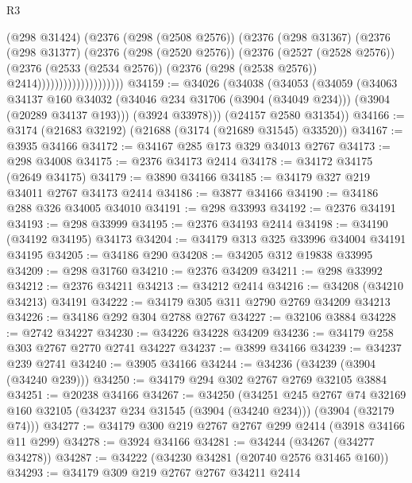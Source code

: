 \begin{lexlean}{R3}
\begin{coremodule}
                              (@298 @31424)
                              (@2376
                                (@298 (@2508 @2576))
                                (@2376
                                  (@298 @31367)
                                  (@2376
                                    (@298 @31377)
                                    (@2376
                                      (@298 (@2520 @2576))
                                      (@2376
                                        (@2527 (@2528 @2576))
                                        (@2376
                                          (@2533 (@2534 @2576))
                                          (@2376 (@298 (@2538 @2576)) @2414))))))))))))))))))))
@34159 := @34026
    (@34038
      (@34053
        (@34059
          (@34063
            @34137
            @160
            @34032
            (@34046 @234 @31706 (@3904 (@34049 @234)))
            (@3904 (@20289 @34137 @193)))
          (@3924 @33978)))
      (@24157 @2580 @31354))
@34166 := @3174 (@21683 @32192) (@21688 (@3174 (@21689 @31545) @33520))
@34167 := @3935 @34166
@34172 := @34167 @285 @173 @329 @34013 @2767
@34173 := @298 @34008
@34175 := @2376 @34173 @2414
@34178 := @34172 @34175 (@2649 @34175)
@34179 := @3890 @34166
@34185 := @34179 @327 @219 @34011 @2767 @34173 @2414
@34186 := @3877 @34166
@34190 := @34186 @288 @326 @34005 @34010
@34191 := @298 @33993
@34192 := @2376 @34191
@34193 := @298 @33999
@34195 := @2376 @34193 @2414
@34198 := @34190 (@34192 @34195) @34173
@34204 := @34179 @313 @325 @33996 @34004 @34191 @34195
@34205 := @34186 @290
@34208 := @34205 @312 @19838 @33995
@34209 := @298 @31760
@34210 := @2376 @34209
@34211 := @298 @33992
@34212 := @2376 @34211
@34213 := @34212 @2414
@34216 := @34208 (@34210 @34213) @34191
@34222 := @34179 @305 @311 @2790 @2769 @34209 @34213
@34226 := @34186 @292 @304 @2788 @2767
@34227 := @32106 @3884
@34228 := @2742 @34227
@34230 := @34226 @34228 @34209
@34236 := @34179 @258 @303 @2767 @2770 @2741 @34227
@34237 := @3899 @34166
@34239 := @34237 @239 @2741
@34240 := @3905 @34166
@34244 := @34236 (@34239 (@3904 (@34240 @239)))
@34250 := @34179 @294 @302 @2767 @2769 @32105 @3884
@34251 := @20238 @34166
@34267 := @34250
    (@34251
      @245
      @2767
      @74
      @32169
      @160
      @32105
      (@34237 @234 @31545 (@3904 (@34240 @234)))
      (@3904 (@32179 @74)))
@34277 := @34179 @300 @219 @2767 @2767 @299 @2414 (@3918 @34166 @11 @299)
@34278 := @3924 @34166
@34281 := @34244 (@34267 (@34277 @34278))
@34287 := @34222 (@34230 @34281 (@20740 @2576 @31465 @160))
@34293 := @34179 @309 @219 @2767 @2767 @34211 @2414

\end{coremodule}
\end{lexlean}
